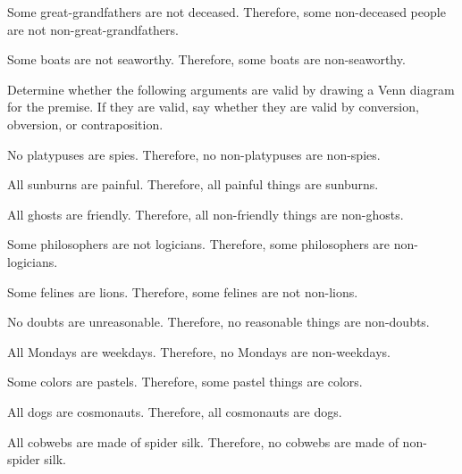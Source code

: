 \begin{exercises}
\item Some great-grandfathers are not deceased. Therefore, some non-deceased people are not non-great-grandfathers. 


\item Some boats are not seaworthy. Therefore, some boats are non-seaworthy.

\end{exercises}


\noindent \problempart Determine whether the following arguments are valid by drawing a Venn diagram for the premise. If they are valid, say whether they are valid by conversion, obversion, or contraposition.

\begin{exercises}
\item No platypuses are spies. Therefore, no non-platypuses are non-spies.     
\item All sunburns are painful. Therefore, all painful things are sunburns. 
\item All ghosts are friendly. Therefore, all non-friendly things are non-ghosts.  
\item Some philosophers are not logicians. Therefore, some philosophers are non-logicians. 
\item Some felines are lions. Therefore, some felines are not non-lions.  
\item No doubts are unreasonable. Therefore, no reasonable things are non-doubts.      
\item All Mondays are weekdays. Therefore, no Mondays are non-weekdays.  
\item Some colors are pastels. Therefore, some pastel things are colors.  
\item All dogs are cosmonauts. Therefore, all cosmonauts are dogs.     
\item All cobwebs are made of spider silk. 	Therefore, no cobwebs are made of non-spider silk.  
\end{exercises}

